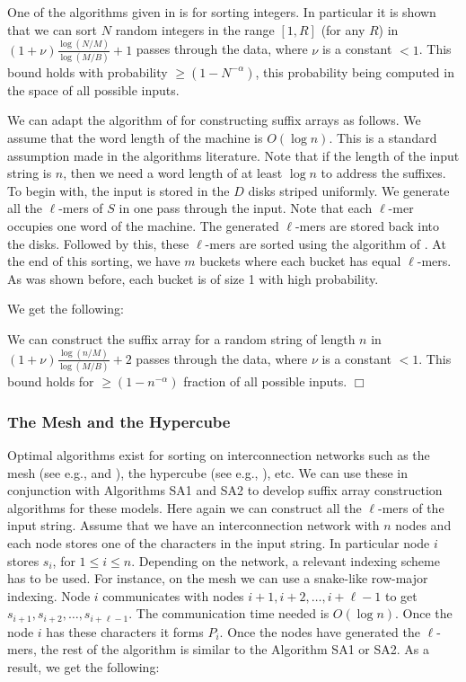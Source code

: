 One of the algorithms given in \cite{RaSe08} is for sorting integers. In
particular it is shown that we can sort $N$ random integers in the range
$[1,R]$  (for any $R$) in $(1+\nu)\frac{\log(N/M)}{\log(M/B)}+1$ passes through
the data, where $\nu$ is a constant $<1$. This bound holds with probability
$\geq (1-N^{-\alpha})$, this probability being computed in the space of all
possible inputs.

We can adapt the algorithm of \cite{RaSe08} for constructing suffix arrays as
follows. We assume that the word length of the machine is $O(\log n)$. This is
a standard assumption made in the algorithms literature. Note that if the
length of the input string is $n$, then we need a word length of at least $\log
n$ to address the suffixes. To begin with, the input is stored in the $D$ disks
striped uniformly. We generate all the $\ell$-mers of $S$ in one pass through
the input. Note that each $\ell$-mer occupies one word of the machine. The
generated $\ell$-mers are stored back into the disks. Followed by this, these
$\ell$-mers are sorted using the algorithm of \cite{RaSe08}. At the end of this
sorting, we have $m$ buckets where each bucket has equal $\ell$-mers. As was
shown before, each bucket is of size 1 with high probability. 

We get the following:
\begin{theorem}
We can construct the suffix array for a random string of length $n$  in
$(1+\nu)\frac{\log(n/M)}{\log(M/B)}+2$ passes through the data, where $\nu$ is
a constant $<1$. This bound holds for $\geq (1-n^{-\alpha})$ fraction of all
possible inputs. $\Box$ 
\end{theorem} 

\subsubsection{The Mesh and the Hypercube}
Optimal algorithms exist for sorting on interconnection networks such as the
mesh (see e.g., \cite{ThKu77} and \cite{KKNT91}), the hypercube (see e.g.,
\cite{ReVa87}), etc. We can use these in conjunction with Algorithms SA1 and
SA2 to develop suffix array construction algorithms for these models. Here
again we can construct all the $\ell$-mers of the input string. Assume that we
have an interconnection network with $n$ nodes and each node stores one of the
characters in the input string. In particular node $i$ stores $s_i$, for $1\leq
i\leq n$. Depending on the network, a relevant indexing scheme has to be used.
For instance, on the mesh we can use a snake-like row-major indexing. Node $i$
communicates with nodes $i+1,i+2,\ldots,i+\ell-1$ to get
$s_{i+1},s_{i+2},\ldots,s_{i+\ell-1}$. The communication time needed is $O(\log
n)$. Once the node $i$ has these characters it forms $P_i$. Once the nodes have
generated the $\ell$-mers, the rest of the algorithm is similar to the
Algorithm SA1 or SA2. As a result, we get the following:

